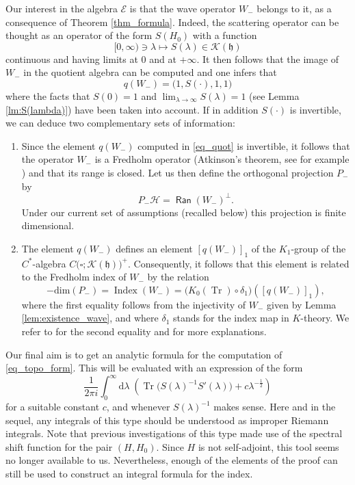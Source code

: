 \documentclass{article}
\def\d{\mathrm{d}}
\def\H{\mathcal H}
\def\K{\mathscr K}
\def\HS{\mathfrak h}
\def\EE{\mathscr E}
\def\Ran{\mathop{\mathsf{Ran}}\nolimits}
\def\index{\mathop{\mathrm{Index}}\nolimits}
\def\dim{\mathop{\mathrm{dim}}\nolimits}
\def\Tr{\mathop{\mathrm{Tr}}\nolimits}
\def\dim{{\mathrm{dim}}}
\begin{document}
Our interest in the algebra $\EE$ is that the wave operator $W_-$ belongs to it, as a
consequence of Theorem \ref{thm_formula}. Indeed, the scattering operator can be thought as an operator
of the form $S(H_0)$ with a function 
$$
[0,\infty)\ni \lambda \mapsto S(\lambda)\in \K(\HS)
$$
continuous and having limits at $0$ and at $+\infty$.
It then follows that the image of $W_-$ in the quotient algebra can be computed and one infers that
\begin{equation}\label{eq_quot}
q(W_-) = \big(1, S(\cdot), 1, 1\big)
\end{equation}
where the facts that $S(0)=1$ and $\lim_{\lambda\to \infty}S(\lambda)=1$ (see Lemma \ref{lm:S(lambda)}) have been taken into account.
If in addition $S(\cdot)$ is invertible, we can deduce two complementary sets of information: 
\begin{enumerate}[label=(\roman*)]
\item Since the element $q(W_-)$ computed in \eqref{eq_quot} is invertible, it follows that the operator $W_-$ is a Fredholm operator (Atkinson's theorem, see for example \cite[Prop.~3.3.11]{Ped}) and that its range is closed.
Let us then define the orthogonal projection $P_-$ by
\begin{equation}\label{eq_P_-}
P_-\H = \Ran(W_-)^\bot.
\end{equation}
Under our current set of assumptions (recalled below) this projection is finite dimensional.
\item The element $q(W_-)$ defines an element $[q(W_-)]_1$ of the $K_1$-group of the $C^*$-algebra $C\big(\square; \K(\HS)\big)^+$.
Consequently, it follows that this element is related to the Fredholm index of $W_-$ by the relation
\begin{equation}\label{eq_topo_form}
-\dim(P_-)=\index(W_-) = \big(K_0(\Tr)\circ \delta_1 \big)([q(W_-)]_1),
\end{equation}
where the first equality follows from the injectivity of $W_-$ given by Lemma \ref{lem:existence_wave}, and where $\delta_1$ stands for the index map in $K$-theory.
We refer to \cite[Prop.~9.4.2]{RLL} for the second equality and for more explanations. 
\end{enumerate}

Our final aim is to get an analytic formula for the computation of \eqref{eq_topo_form}. 
This will be evaluated with an expression of the form
$$
\frac{1}{2\pi i} \int_0^\infty \d \lambda \;\!\left(\Tr\big(S(\lambda)^{-1}S'(\lambda)\big) + c \lambda^{-\frac12} \right)
$$
for a suitable constant $c$, and whenever $S(\lambda)^{-1}$ makes sense.
Here and in the sequel, any integrals of this type should be understood as improper Riemann integrals.
Note that previous investigations of this type made use of the spectral shift function for the pair $(H,H_0)$. Since $H$ is not self-adjoint, this tool seems no longer available to us. Nevertheless, enough of the elements of the proof can still be used to construct an integral formula for the index.
\end{document}
